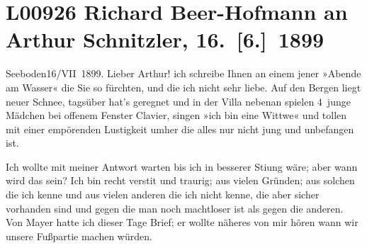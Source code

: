 

\section[Richard Beer-Hofmann an Arthur Schnitzler, 16. {[}6.{]} 1899]{L00926 Richard Beer-Hofmann an Arthur Schnitzler, 16. {[}6.{]} 1899}
\nopagebreak{}
\rehead{ }\normalsize\beginnumbering{}
\toendnotes[C]{\smallbreak\pagebreak[2]}
\toendnotes[C]{\smallbreak}
\pstart
           \raggedleft{}{\pb}Seeboden16/VII 1899.\pend
           \vspace{0.5em}
\pstart
           Lieber Arthur! ich schreibe Ihnen an einem jener »Abende am Wasser«
               die Sie so fürchten, und die ich nicht sehr liebe. Auf den Bergen liegt neuer Schnee,
               tagsüber hat’s geregnet und in der Villa nebenan spielen 4 junge Mäd{\pb}chen bei offenem Fenster Clavier,
               singen »ich bin eine Wittwe« und tollen mit
               einer empörenden Lustigkeit umher die alles nur nicht jung und unbefangen ist.\pend
           
\pstart
           Ich wollte mit meiner Antwort warten bis ich in besserer Sti{\geminationm}ung wäre; aber wann {\pb}wird das sein? Ich bin recht
                  versti{\geminationm}t und traurig; aus vielen Gründen; aus solchen
                   die ich kenne und aus vielen anderen die ich
               nicht kenne, die aber sicher vorhanden sind und gegen die man noch machtloser {\pb}ist als gegen die anderen. Von Mayer hatte ich dieser Tage Brief; er wollte
               näheres von mir hören wann wir unsere Fußpartie machen würden.\pend
           
